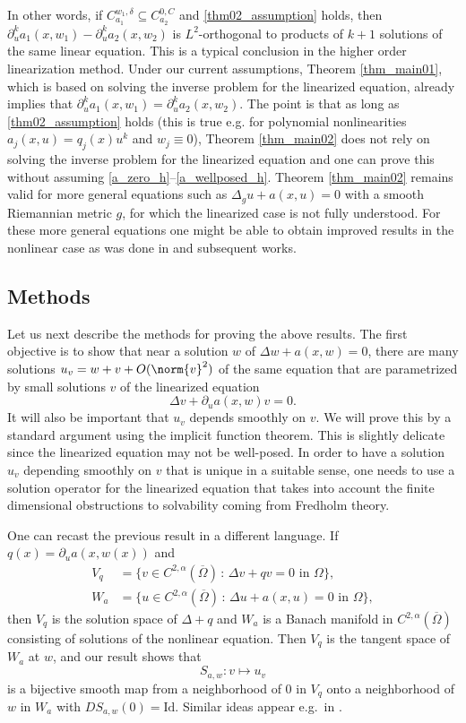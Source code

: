 \documentclass[11pt,a4paper]{amsart}
\theoremstyle{definition}
\numberwithin{equation}{section}
\newcommand{\ol}[1]{\overline{#1}}
\newcommand{\p}{\partial}
\newcommand{\Om}{\Omega}
\begin{document}
In other words, if $C_{a_1}^{w_1,\delta} \subseteq C_{a_2}^{0,C}$ and \eqref{thm02_assumption} holds, then $\p_u^k a_1(x,w_1) - \p_u^k a_2(x,w_2)$ is $L^2$-orthogonal to products of $k+1$ solutions of the same linear equation. This is a typical conclusion in the higher order linearization method. Under our current assumptions, Theorem \ref{thm_main01}, which is based on solving the inverse problem for the linearized equation, already implies that $\p_u^k a_1(x,w_1) = \p_u^k a_2(x,w_2)$. The point is that as long as \eqref{thm02_assumption} holds (this is true e.g. for polynomial nonlinearities $a_j(x,u) = q_j(x) u^k$ and $w_j \equiv 0$), Theorem \ref{thm_main02} does not rely on solving the inverse problem for the linearized equation and one can prove this without assuming \eqref{a_zero_h}--\eqref{a_wellposed_h}.
Theorem \ref{thm_main02} remains valid for more general equations such as $\Delta_g u + a(x,u) = 0$ with a smooth Riemannian metric $g$, for which the linearized case is not fully understood. For these more general equations one might be able to obtain improved results in the nonlinear case as was done in \cites{FO, LLLS} and subsequent works.

\subsection*{Methods}

Let us next describe the methods for proving the above results. The first objective is to show that near a solution $w$ of $\Delta w + a(x,w) = 0$, there are many solutions $u_v = w + v + O(\norm{v}^2)$ of the same equation that are parametrized by small solutions $v$ of the linearized equation 
\[
\Delta v + \p_u a(x,w) v = 0.
\]
It will also be important that $u_v$ depends smoothly on $v$. We will prove this by a standard argument using the implicit function theorem. This is slightly delicate since the linearized equation may not be well-posed. In order to have a solution $u_v$ depending smoothly on $v$ that is unique in a suitable sense, one needs to use a solution operator for the linearized equation that takes into account the finite dimensional obstructions to solvability coming from Fredholm theory.

One can recast the previous result in a different language. If $q(x) = \p_u a(x,w(x))$ and 
\begin{align*}
V_q &= \{ v \in C^{2,\alpha}(\ol{\Om}) \,:\, \Delta v + q v = 0 \text{ in $\Om$} \},\\
W_a &= \{ u \in C^{2,\alpha}(\ol{\Om}) \,:\, \Delta u + a(x,u) = 0 \text{ in $\Om$} \},
\end{align*}
then $V_q$ is the solution space of $\Delta + q$ and $W_a$ is a Banach manifold in $C^{2,\alpha}(\ol{\Om})$ consisting of solutions of the nonlinear equation. Then $V_q$ is the tangent space of $W_a$ at $w$, and our result shows that 
\[
S_{a,w}: v \mapsto u_v
\]
is a bijective smooth map from a neighborhood of $0$ in $V_q$ onto a neighborhood of $w$ in $W_a$ with $D S_{a,w}(0) = \mathrm{Id}$. Similar ideas appear e.g.\ in \cites{Eells, Palais, Sunada}.
\end{document}
